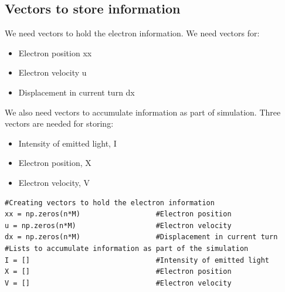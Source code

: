 \documentclass[11pt, a4paper]{article}
\begin{document}
\subsection{Vectors to store information}
    We need vectors to hold the electron information. We need vectors for:
    \begin{itemize}
        \item Electron position xx
        \item Electron velocity u
        \item Displacement in current turn dx
    \end{itemize}
    We also need vectors to accumulate information as part of simulation. Three vectors are needed for storing:
    \begin{itemize}
        \item Intensity of emitted light, I
        \item Electron position, X
        \item Electron velocity, V
    \end{itemize}
    \begin{verbatim}
#Creating vectors to hold the electron information
xx = np.zeros(n*M)                  #Electron position
u = np.zeros(n*M)                   #Electron velocity
dx = np.zeros(n*M)                  #Displacement in current turn
#Lists to accumulate information as part of the simulation
I = []                              #Intensity of emitted light
X = []                              #Electron position
V = []                              #Electron velocity        
    \end{verbatim}
\end{document}
